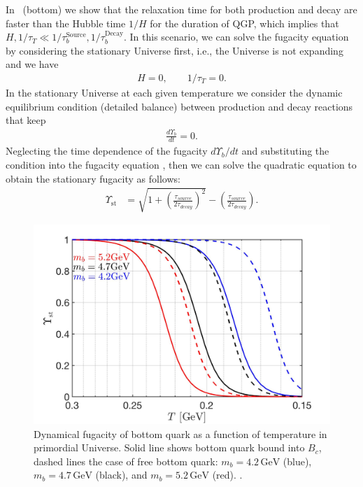 In~ (bottom) we show that the relaxation time for both production and decay are faster than the Hubble time $1/H$ for the duration of QGP, which implies that $H,1/\tau_T\ll1/\tau_{b}^{\mathrm{Source}},1/\tau^{\mathrm{Decay}}_b$. In this scenario, we can solve the fugacity equation by considering the stationary Universe first, i.e., the Universe is not expanding and we have
\begin{align}\label{stationary}
H=0,\qquad 1/\tau_T=0.
\end{align} 
In the stationary Universe at each given temperature we consider the dynamic equilibrium condition (detailed balance) between production and decay reactions that keep
\begin{align}
\frac{d\Upsilon_b}{dt}=0.
\end{align}
Neglecting the time dependence of the fugacity $d\Upsilon_b/dt$ and substituting the condition  into the fugacity equation , then we can solve the quadratic equation to obtain the stationary fugacity as follows: %
\begin{align}
\label{Fugacity_Sol}
\Upsilon_{\mathrm{st}}&=\sqrt{1+\left(\frac{\tau_{source}}{2\tau_{decay}}\right)^2}-\left(\frac{\tau_{source}}{2\tau_{decay}}\right).
\end{align} 

\begin{figure} 
\centerline{\includegraphics[width=0.8\linewidth]{./plots/BquarkFugacity_tot}}
\caption{Dynamical fugacity of bottom quark as a function of temperature in primordial Universe. Solid line shows bottom quark bound into $B_c$, dashed lines the case of free bottom quark: $m_b=4.2\,\mathrm{GeV}$ (blue), $m_b=4.7\,\mathrm{GeV}$ (black), and $m_b=5.2\,\mathrm{GeV}$ (red). . }
\label{fugacity_bc}
\end{figure}

